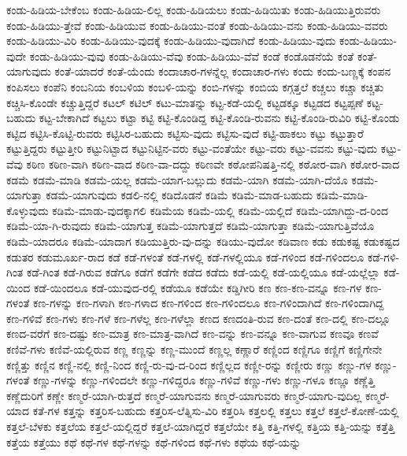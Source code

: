 {ಕಂಡು-ಹಿಡಿಯ-ಬೇಕೆಂಬ
ಕಂಡು-ಹಿಡಿಯ-ಲಿಲ್ಲ
ಕಂಡು-ಹಿಡಿಯಲು
ಕಂಡು-ಹಿಡಿಯಿತು
ಕಂಡು-ಹಿಡಿಯುತ್ತಿರುವರು
ಕಂಡು-ಹಿಡಿಯು-ತ್ತೇವೆ
ಕಂಡು-ಹಿಡಿಯುವ
ಕಂಡು-ಹಿಡಿಯು-ವಂತೆ
ಕಂಡು-ಹಿಡಿಯು-ವನು
ಕಂಡು-ಹಿಡಿಯು-ವವರು
ಕಂಡು-ಹಿಡಿಯು-ವಿರಿ
ಕಂಡು-ಹಿಡಿಯು-ವುದಕ್ಕೆ
ಕಂಡು-ಹಿಡಿಯು-ವುದಾಗಿದೆ
ಕಂಡು-ಹಿಡಿಯು-ವುದು
ಕಂಡು-ಹಿಡಿಯು-ವುದೇ
ಕಂಡು-ಹಿಡಿಯು-ವುವು
ಕಂಡು-ಹಿಡಿಯು-ವೆವು
ಕಂಡು-ಹಿಡಿಯು-ವೆವೆ
ಕಂಡೆ
ಕಂಡೊಡನೆಯೆ
ಕಂತೆ
ಕಂತೆ-ಯಾಗುವುದು
ಕಂತೆ-ಯಾದರೆ
ಕಂತೆ-ಯೆಂದು
ಕಂದಾಚಾರ-ಗಳನ್ನೆಲ್ಲ
ಕಂದಾಚಾರ-ಗಳು
ಕಂದು
ಕಂದು-ಬಣ್ಣಕ್ಕೆ
ಕಂಪನ
ಕಂಪಿಸಲು
ಕಂಪೆನಿ
ಕಂಬನಿಯ
ಕಂಬಳಿಯ
ಕಂಬಳಿ-ಯನ್ನು
ಕಂಬಿ-ಗಳನ್ನು
ಕಂಬಿಯ
ಕಗ್ಗತ್ತಲೆ
ಕಚ್ಚಲು
ಕಚ್ಚಾ
ಕಚ್ಚಿತು
ಕಚ್ಚಿಸಿ-ಕೊಂಡೇ
ಕಚ್ಚುತ್ತಿದ್ದರೆ
ಕಟಲ್
ಕಟಿಲ್
ಕಟು-ಮಾತನ್ನು
ಕಟ್ಟ-ಕಡೆ-ಯಲ್ಲಿ
ಕಟ್ಟಡಕ್ಕೂ
ಕಟ್ಟಡದ
ಕಟ್ಟಪ್ಪಣೆ
ಕಟ್ಟ-ಬಹುದು
ಕಟ್ಟ-ಬೇಕಾಗಿದೆ
ಕಟ್ಟಲು
ಕಟ್ಟಾ
ಕಟ್ಟಿ
ಕಟ್ಟಿ-ಕೊಂಡಿದ್ದ
ಕಟ್ಟಿ-ಕೊಂಡಿ-ರುವನು
ಕಟ್ಟಿ-ಕೊಂಡಿ-ರುವಿರಿ
ಕಟ್ಟಿ-ಕೊಂಡು
ಕಟ್ಟಿದ
ಕಟ್ಟಿಸಿ-ಕೊಟ್ಟಿ-ರುವರು
ಕಟ್ಟಿಸಿರ-ಬಹುದು
ಕಟ್ಟಿಸು-ವುದು
ಕಟ್ಟಿಸು-ವುದೆ
ಕಟ್ಟಿ-ಹಾಕಲು
ಕಟ್ಟು
ಕಟ್ಟುತ್ತಾರೆ
ಕಟ್ಟುತ್ತಿದ್ದರು
ಕಟ್ಟುತ್ತೀರಿ
ಕಟ್ಟುನಿಟ್ಟಾದ
ಕಟ್ಟುನಿಟ್ಟಿನ-ವರು
ಕಟ್ಟು-ವಂತೆಯೇ
ಕಟ್ಟು-ವರು
ಕಟ್ಟು-ವವನು
ಕಟ್ಟು-ವುದು
ಕಟ್ಟು-ವೆವು
ಕಠಿಣ
ಕಠಿಣ-ವಾಗಿ
ಕಠಿಣ-ವಾದ
ಕಠಿಣ-ವಾ-ದದ್ದು
ಕಠಿಣವೇ
ಕಠೋಪನಿಷತ್ತಿ-ನಲ್ಲಿ
ಕಠೋರ-ವಾಗಿ
ಕಠೋರ-ವಾದ
ಕಡಮೆ
ಕಡಮೆ-ಮಾಡಿ
ಕಡಮೆ-ಯಲ್ಲ
ಕಡಮೆ-ಯಾಗ-ಬಲ್ಲುದು
ಕಡಮೆ-ಯಾಗಿ
ಕಡಮೆ-ಯಾಗಿ-ದೆಯೊ
ಕಡಮೆ-ಯಾಗುತ್ತಾ
ಕಡಮೆ-ಯಾಗುವುದು
ಕಡಲಿ-ನಲ್ಲಿ
ಕಡಿದೊಡನೆ
ಕಡಿಮೆ
ಕಡಿಮೆ-ಮಾಡ-ಬಹುದು
ಕಡಿಮೆ-ಮಾಡಿ-ಕೊಳ್ಳುವುದು
ಕಡಿಮೆ-ಮಾಡು-ವುದಕ್ಕಾಗಲಿ
ಕಡಿಮೆಯ
ಕಡಿಮೆ-ಯಲ್ಲಿ
ಕಡಿಮೆ-ಯಲ್ಲಿದೆ
ಕಡಿಮೆ-ಯಾಗಿದ್ದು-ದ-ರಿಂದ
ಕಡಿಮೆ-ಯಾ-ಗಿ-ರುವುದು
ಕಡಿಮೆ-ಯಾಗುತ್ತ
ಕಡಿಮೆ-ಯಾಗುತ್ತದೆ
ಕಡಿಮೆ-ಯಾಗುತ್ತಾ
ಕಡಿಮೆ-ಯಾಗುತ್ತಿವೆಯೊ
ಕಡಿಮೆ-ಯಾದರೂ
ಕಡಿಮೆ-ಯಾದಾಗ
ಕಡಿಯುತ್ತಿರು-ವು-ದನ್ನು
ಕಡಿಯು-ವುದೋ
ಕಡಿವಾಣ
ಕಡು
ಕಡುಕಷ್ಟ
ಕಡುಕಷ್ಟದ
ಕಡುತರ
ಕಡುಮೂರ್ಖ-ರಾದ
ಕಡೆ
ಕಡೆ-ಗಳಂತೆ
ಕಡೆ-ಗಳಲ್ಲಿ
ಕಡೆ-ಗಳಲ್ಲಿಯೂ
ಕಡೆ-ಗಳಿಂದ
ಕಡೆ-ಗಳಿಂದಲೂ
ಕಡೆ-ಗಳಿ-ಗಿಂತ
ಕಡೆ-ಗಿಂತ
ಕಡೆ-ಗಿರುವ
ಕಡೆಗೂ
ಕಡೆಗೆ
ಕಡೆಗೇ
ಕಡೆದ
ಕಡೆದು
ಕಡೆ-ಯಲ್ಲಿ
ಕಡೆ-ಯಲ್ಲಿಯೂ
ಕಡೆ-ಯಲ್ಲೆಲ್ಲಾ
ಕಡೆ-ಯಿಂದ
ಕಡೆ-ಯಿಂದಲೂ
ಕಡೆ-ಯುವುದ-ರಲ್ಲಿ
ಕಡೆಯೂ
ಕಡೆಯೇ
ಕಡ್ಡಿಗೀರಿ
ಕಣ
ಕಣ-ಕಣ-ವನ್ನೂ
ಕಣ-ಗಳ
ಕಣ-ಗಳಂತೆ
ಕಣ-ಗಳನ್ನು
ಕಣ-ಗಳಾಗಿ
ಕಣ-ಗಳಾದ
ಕಣ-ಗಳಿಂದ
ಕಣ-ಗಳಿಂದಲೂ
ಕಣ-ಗಳಿಂದಾಗಿದೆ
ಕಣ-ಗಳಿಂದಾಗಿದ್ದ
ಕಣ-ಗಳಿವೆ
ಕಣ-ಗಳು
ಕಣ-ಗಳೆ
ಕಣ-ಗಳೆಲ್ಲ
ಕಣ-ಗಳೆಲ್ಲಾ
ಕಣದ
ಕಣದಂತಿ-ರುವ
ಕಣ-ದಂತೆ
ಕಣ-ದಲ್ಲಿ
ಕಣ-ದಲ್ಲೂ
ಕಣದ-ವರೆಗೆ
ಕಣ-ದಷ್ಟು
ಕಣ-ಮಾತ್ರ
ಕಣ-ಮಾತ್ರ-ವಾಗಿದೆ
ಕಣ-ವನ್ನು
ಕಣ-ವನ್ನೂ
ಕಣ-ವಾಗುವ
ಕಣವೂ
ಕಣವೆ
ಕಣಿವೆ-ಗಳು
ಕಣಿವೆ-ಯಲ್ಲಿರುವ
ಕಣ್ಣ
ಕಣ್ಣನ್ನು
ಕಣ್ಣ-ಮುಂದೆ
ಕಣ್ಣಲ್ಲ
ಕಣ್ಣಾರೆ
ಕಣ್ಣಿಂದ
ಕಣ್ಣಿಗೂ
ಕಣ್ಣಿಗೆ
ಕಣ್ಣಿಗೇನೇ
ಕಣ್ಣಿತ್ತು
ಕಣ್ಣಿನ
ಕಣ್ಣಿ-ನಲ್ಲಿ
ಕಣ್ಣಿ-ನಿಂದ
ಕಣ್ಣಿ-ರು-ವು-ದ-ರಿಂದ
ಕಣ್ಣಿಲ್ಲದ
ಕಣ್ಣೀ-ರನ್ನು
ಕಣ್ಣೀರು
ಕಣ್ಣು
ಕಣ್ಣು-ಗಳ
ಕಣ್ಣು-ಗಳಂತೆ
ಕಣ್ಣು-ಗಳನ್ನು
ಕಣ್ಣು-ಗಳಿಂದಲೇ
ಕಣ್ಣು-ಗಳಿದ್ದರೂ
ಕಣ್ಣು-ಗಳಿವೆ
ಕಣ್ಣು-ಗಳು
ಕಣ್ಣು-ಗಳೂ
ಕಣ್ಣೂ
ಕಣ್ಣೆತ್ತಿ
ಕಣ್ಣೆದುರಿಗೆ
ಕಣ್ಣೇ
ಕಣ್ಮರೆ-ಯಾಗಿ-ರುತ್ತದೆ
ಕಣ್ಮರೆ-ಯಾಗುವನು
ಕಣ್ಮರೆ-ಯಾಗುವರು
ಕಣ್ಮರೆ-ಯಾಗು-ವುದಿಲ್ಲ
ಕಣ್ಮರೆ-ಯಾದ
ಕತೆ-ಗಳ
ಕತ್ತನ್ನು
ಕತ್ತರಿಸ-ಬಹುದು
ಕತ್ತರಿಸ-ಲೆತ್ನಿಸು-ವಿರಿ
ಕತ್ತರಿಸಿ
ಕತ್ತಲಲ್ಲಿ
ಕತ್ತಲು
ಕತ್ತಲೆ
ಕತ್ತಲೆ-ಕೋಣೆ-ಯಲ್ಲಿ
ಕತ್ತಲೆ-ಬೆಳಕು
ಕತ್ತಲೆಯ
ಕತ್ತಲೆ-ಯಲ್ಲಿದ್ದರೆ
ಕತ್ತಲೆ-ಯಾಗಿದ್ದರೆ
ಕತ್ತಲೆಯೇ
ಕತ್ತಿ
ಕತ್ತಿ-ಗಳಲ್ಲಿ
ಕತ್ತಿಯ
ಕತ್ತಿ-ಯನ್ನು
ಕತ್ತೆತ್ತಿ
ಕತ್ತೆಯ
ಕತ್ತೆಯು
ಕಥೆ
ಕಥೆ-ಗಳ
ಕಥೆ-ಗಳನ್ನು
ಕಥೆ-ಗಳಿಂದ
ಕಥೆ-ಗಳು
ಕಥೆಯ
ಕಥೆ-ಯನ್ನು
}

